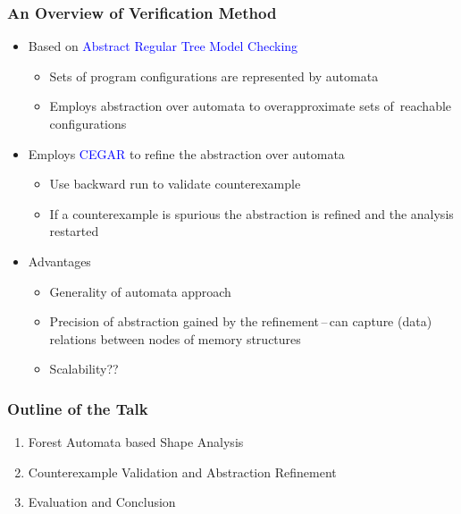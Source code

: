 \documentclass{beamer}
\newcommand{\hlbl}[1]{\textcolor{blue}{#1}}
\begin{document}
\begin{frame}
  \frametitle{An Overview of Verification Method}
   \begin{itemize}
      \item Based on \hlbl{Abstract Regular Tree Model Checking} 
		\begin{itemize}
			\item Sets of program configurations are represented by automata
			\item Employs abstraction over automata to overapproximate sets of~reachable configurations
		\end{itemize}
	   \item Employs \hlbl{CEGAR} to refine the abstraction over automata
		   \begin{itemize}
				\item Use backward run to validate counterexample
				\item If a counterexample is spurious the abstraction is refined and the analysis restarted
		   \end{itemize}
	\item Advantages
	   \begin{itemize}
		 \item Generality of automata approach
		 \item Precision of abstraction gained by the refinement\,--\,can capture (data) relations
			 between nodes of memory structures
		 \item Scalability??
	   \end{itemize}
  \end{itemize}
\end{frame}

\begin{frame}
\frametitle{Outline of the Talk}

	\begin{enumerate}
		\item Forest Automata based Shape Analysis
		\item Counterexample Validation and Abstraction Refinement
		\item Evaluation and Conclusion
	\end{enumerate}

\end{frame}
\end{document}
